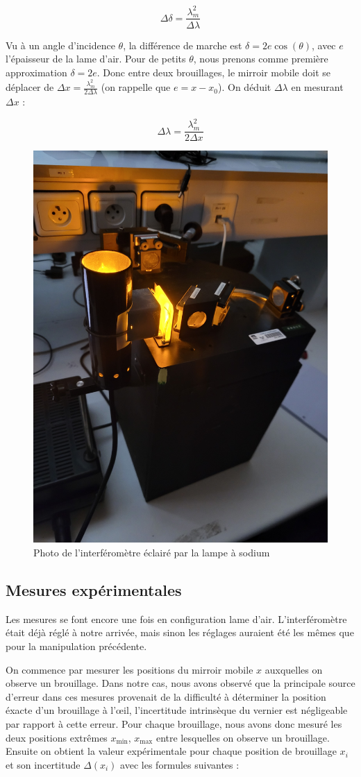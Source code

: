 \documentclass{article}
\begin{document}
$$\Delta \delta = \frac{\lambda_m^2}{\Delta \lambda}$$

Vu à un angle d'incidence $\theta$, la différence de marche est $\delta = 2e\cos(\theta)$, avec $e$ l'épaisseur de la lame d'air. 
Pour de petits $\theta$, nous prenons comme première approximation $\delta = 2e$. Donc entre deux brouillages, le mirroir mobile doit se déplacer de 
$\Delta x = \frac{\lambda_m^2}{2\Delta \lambda}$ (on rappelle que $e = x - x_0$). On déduit $\Delta \lambda$ en mesurant $\Delta x$ :

\begin{equation}
    \Delta \lambda = \frac{\lambda_m^2}{2\Delta x}
    \label{eq:deltalambda}
\end{equation}

\par 
\par 

\begin{figure}[H]
    \centering
    \includegraphics[angle=-90, width=0.4\linewidth]{figs/sodium.jpg}
    \caption{Photo de l'interféromètre éclairé par la lampe à sodium}
    \label{fig:michelson}
\end{figure}

\newpage
\subsection{Mesures expérimentales}

Les mesures se font encore une fois en configuration lame d'air. L'interféromètre était déjà réglé à 
notre arrivée, mais sinon les réglages auraient été les mêmes que pour la manipulation précédente.

On commence par mesurer les positions du mirroir mobile $x$ auxquelles on observe un brouillage. 
Dans notre cas, nous avons observé que la principale source d'erreur dans ces mesures provenait de la difficulté 
à déterminer la position éxacte d'un brouillage à l'œil, l'incertitude intrinsèque du vernier est négligeable par rapport à cette erreur. 
Pour chaque brouillage, nous avons donc mesuré les deux positions extrêmes $x_{\textrm{min}}$, $x_{\textrm{max}}$ entre lesquelles on observe un brouillage. 
Ensuite on obtient la valeur expérimentale pour chaque position de brouillage $x_i$ et son incertitude $\Delta (x_i)$ avec les formules 
suivantes :
\end{document}

